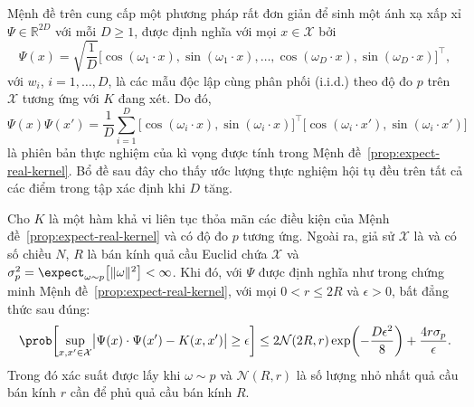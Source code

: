 Mệnh đề trên cung cấp một phương pháp rất đơn giản để sinh một ánh xạ
 xấp xỉ $\Psi \in \mathbb{R}^{2D}$ với mỗi $D \ge 1$, được định
nghĩa với mọi $x \in \mathcal{X}$ bởi \begin{equation}
  \Psi(x) = \sqrt{\frac{1}{D}} \bigl[ \cos(\omega_1 \cdot x), \sin(\omega_1
  \cdot x), \dots, \cos(\omega_D \cdot x), \sin(\omega_D \cdot x) \bigr
  ]^\intercal,
\end{equation} với $w_i$, $i = 1, \dots, D$, là các mẫu độc lập cùng phân phối
(i.i.d.) theo độ đo $p$ trên $\mathcal{X}$ tương ứng với  $K$ đang
xét. Do đó, \begin{equation}
  \Psi(x) \Psi(x') = \frac{1}{D} \sum_{i = 1}^D \bigl[ \cos(\omega_i \cdot x),
  \sin(\omega_i \cdot x) \bigr]^\intercal \bigl[ \cos(\omega_i \cdot x'),
  \sin(\omega_i \cdot x') \bigr]
\end{equation} là phiên bản thực nghiệm của kì vọng được tính trong Mệnh
đề~\ref{prop:expect-real-kernel}.  Bổ đề sau đây cho thấy ước lượng thực nghiệm
hội tụ đều trên tất cả các điểm trong tập xác định  khi $D$ tăng.

\begin{lem}
  \label{lem:prob-sup-bound}
  Cho $K$ là một hàm  khả vi liên tục thỏa mãn các điều kiện của
  Mệnh đề~\ref{prop:expect-real-kernel} và có độ đo $p$ tương ứng. Ngoài ra,
  giả sử $\mathcal{X}$ là  và có số chiều $N$, $R$ là bán kính quả
  cầu Euclid chứa $\mathcal{X}$ và $\sigma_p^2 = \expect_{\omega \sim p }
  \bigl[ \lVert \omega \rVert^2 \bigr ] < \infty$. Khi đó, với $\Psi$ được định
  nghĩa như trong chứng minh Mệnh đề~\ref{prop:expect-real-kernel}, với mọi $0<
  r \le 2R$ và $\epsilon > 0$, bất đẳng thức sau đúng: \begin{equation}
    \prob \biggl[ \sup_{x, x' \in \mathcal{X}} \bigl\lvert \Psi(x) \cdot
    \Psi(x') - K(x, x') \bigr\rvert \ge \epsilon \biggr ] \le 2\mathcal{N}(2R,
    r) \exp\biggl( -\frac{D\epsilon^2}{8} \biggr ) +
    \frac{4r\sigma_p}{\epsilon}.
  \end{equation}Trong đó xác suất được lấy khi $\omega \sim p$ và
  $\mathcal{N}(R, r)$ là số lượng nhỏ nhất quả cầu bán kính $r$ cần để phủ quả
  cầu bán kính $R$.
\end{lem}

